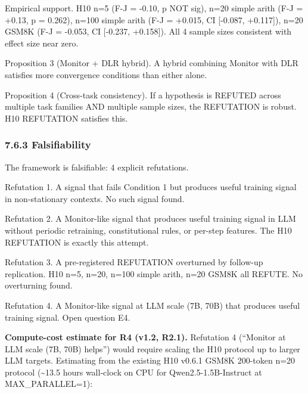 \documentclass[11pt]{article}
\begin{document}
Empirical support. H10 n=5 (F-J = -0.10, p NOT sig), n=20 simple arith
(F-J = +0.13, p = 0.262), n=100 simple arith (F-J = +0.015, CI
{[}-0.087, +0.117{]}), n=20 GSM8K (F-J = -0.053, CI {[}-0.237,
+0.158{]}). All 4 sample sizes consistent with effect size near zero.

Proposition 3 (Monitor + DLR hybrid). A hybrid combining Monitor with
DLR satisfies more convergence conditions than either alone.

Proposition 4 (Cross-task consistency). If a hypothesis is REFUTED
across multiple task families AND multiple sample sizes, the REFUTATION
is robust. H10 REFUTATION satisfies this.

\subsubsection{7.6.3 Falsifiability}\label{falsifiability}

The framework is falsifiable: 4 explicit refutations.

Refutation 1. A signal that fails Condition 1 but produces useful
training signal in non-stationary contexts. No such signal found.

Refutation 2. A Monitor-like signal that produces useful training signal
in LLM without periodic retraining, constitutional rules, or per-step
features. The H10 REFUTATION is exactly this attempt.

Refutation 3. A pre-registered REFUTATION overturned by follow-up
replication. H10 n=5, n=20, n=100 simple arith, n=20 GSM8K all REFUTE.
No overturning found.

Refutation 4. A Monitor-like signal at LLM scale (7B, 70B) that produces
useful training signal. Open question E4.

\textbf{Compute-cost estimate for R4 (v1.2, R2.1).} Refutation 4
(``Monitor at LLM scale (7B, 70B) helps'') would require scaling the H10
protocol up to larger LLM targets. Estimating from the existing H10
v0.6.1 GSM8K 200-token n=20 protocol (\textasciitilde13.5 hours
wall-clock on CPU for Qwen2.5-1.5B-Instruct at MAX\_PARALLEL=1):
\end{document}
